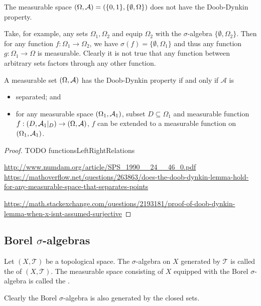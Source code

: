 \begin{example}
The measurable space $\left( \Omega, \mathcal{A} \right) = \left( \{0,1\}, \{\emptyset,\Omega\} \right)$ does not have the Doob-Dynkin property. 

Take, for example, any sets $\Omega_1, \Omega_2$ and equip $\Omega_2$ with the $\sigma$-algebra $\{\emptyset, \Omega_2\}$. Then for any function $f:\Omega_1 \to \Omega_2$, we have $\sigma(f) = \{\emptyset, \Omega_1\}$ and thus any function $g: \Omega_1 \to \Omega$ is measurable. Clearly it is not true that any function between arbitrary sets factors through any other function.
\end{example}


\begin{proposition}
A measurable set $\left( \Omega,\mathcal{A} \right)$ has the Doob-Dynkin property \textup{if and only if} $\mathcal{A}$ is
\begin{itemize}
\item separated; and
\item for any measurable space $\left( \Omega_1,\mathcal{A}_1 \right)$, subset $D\subseteq \Omega_1$ and measurable function $f: \left( D,\mathcal{A}_1|_D \right) \to \left( \Omega,\mathcal{A} \right)$, $f$ can be extended to a measurable function on $\left( \Omega_1,\mathcal{A}_1 \right)$.
\end{itemize}
\end{proposition}
\begin{proof}
TODO {functionsLeftRightRelations}

\url{http://www.numdam.org/article/SPS_1990__24__46_0.pdf}
\url{https://mathoverflow.net/questions/263863/does-the-doob-dynkin-lemma-hold-for-any-measurable-space-that-separates-points}

\url{https://math.stackexchange.com/questions/2193181/proof-of-doob-dynkin-lemma-when-x-isnt-assumed-surjective}
\end{proof}


\subsection{Borel $\sigma$-algebras}
\begin{definition}
Let $(X,\mathcal{T})$ be a topological space. The $\sigma$-algebra on $X$ generated by $\mathcal{T}$ is called the  of $(X,\mathcal{T})$. The measurable space consisting of $X$ equipped with the Borel $\sigma$-algebra is called the .
\end{definition}
Clearly the Borel $\sigma$-algebra is also generated by the closed sets.

